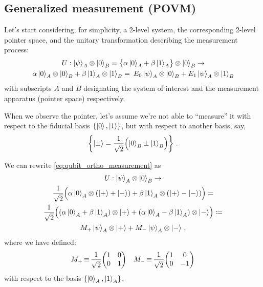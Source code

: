 \subsection{Generalized measurement (POVM)}
\label{subsec:POVM}

Let's start considering, for simplicity, a 2-level system,
the corresponding 2-level pointer space,
and the unitary transformation describing the measurement process:
\begin{multline}\label{eq:qubit_ortho_measurement}
  U:
    \ket{\psi}_A \otimes \ket{0}_B
    = \qty\big{\alpha\ket{0}_A + \beta\ket{1}_A} \otimes \ket{0}_B
  \rightarrow \\
    \alpha\ket{0}_A \otimes \ket{0}_B + \beta\ket{1}_A  \otimes \ket{1}_B =
    \:
    E_0\ket{\psi}_A \otimes \ket{0}_B + E_1\ket{\psi}_A \otimes \ket{1}_B
\end{multline}
with subscripts $A$ and $B$ designating the system of interest and
the measurement apparatus (pointer space) respectively.

When we observe the pointer, let's assume we're not
able to ``measure'' it with respect to the fiducial basis
$\left\{\ket{0}, \ket{1}\right\}$,
but with respect to another basis, say,
\begin{equation}\label{eq:pmbasis}
\left\{\ket{\pm} = \frac{1}{\sqrt{2}} \qty\Big(\ket{0}_B \pm \ket{1}_B)\right\} \,\text{.}
\end{equation}

We can rewrite \eqref{eq:qubit_ortho_measurement} as
\begin{multline}\label{eq:qubit_gen_measurement}
  U: \ket{\psi}_A \otimes \ket{0}_B                   \rightarrow \\
  \frac{1}{\sqrt{2}} \qty\Big(
    \alpha\ket{0}_A \otimes \qty(\ket{+}+\ket{-}) +
    \beta \ket{1}_A \otimes \qty(\ket{+}-\ket{-})
  )                                               =           \\
  \frac{1}{\sqrt{2}} \qty\Big(
    \qty(\alpha\ket{0}_A + \beta\ket{1}_A) \otimes \ket{+} +
    \qty(\alpha\ket{0}_A - \beta\ket{1}_A) \otimes \ket{-}
  )                                               \coloneqq      \\
  M_+\ket{\psi}_A \otimes \ket{+} + M_-\ket{\psi}_A \otimes \ket{-}
  \,\text{,}
\end{multline}
where we have defined:
\begin{align*}
  &
  M_+ \repr \frac{1}{\sqrt{2}}\mqty(\imat{2})
  &
  M_- \repr \frac{1}{\sqrt{2}}\mqty(1& 0\\0& -1)
\end{align*}
with respect to the basis $\left\{\ket{0}_A, \ket{1}_A\right\}$.

